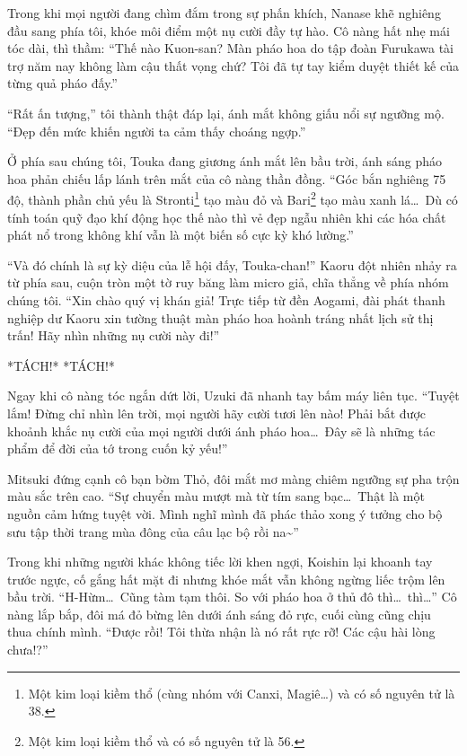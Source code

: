 \documentclass[../main.tex]{subfiles}
\begin{document}
Trong khi mọi người đang chìm đắm trong sự phấn khích, Nanase khẽ nghiêng đầu sang phía tôi, khóe môi điểm một nụ cười đầy tự hào. Cô nàng hất nhẹ mái tóc dài, thì thầm: ``Thế nào Kuon-san? Màn pháo hoa do tập đoàn Furukawa tài trợ năm nay không làm cậu thất vọng chứ? Tôi đã tự tay kiểm duyệt thiết kế của từng quả pháo đấy.''

``Rất ấn tượng,'' tôi thành thật đáp lại, ánh mắt không giấu nổi sự ngưỡng mộ. ``Đẹp đến mức khiến người ta cảm thấy choáng ngợp.''

Ở phía sau chúng tôi, Touka đang giương ánh mắt lên bầu trời, ánh sáng pháo hoa phản chiếu lấp lánh trên mắt của cô nàng thần đồng. ``Góc bắn nghiêng 75 độ, thành phần chủ yếu là Stronti\footnote{Một kim loại kiềm thổ (cùng nhóm với Canxi, Magiê\dots) và có số nguyên tử là 38.} tạo màu đỏ và Bari\footnote{Một kim loại kiềm thổ và có số nguyên tử là 56.} tạo màu xanh lá\dots\ Dù có tính toán quỹ đạo khí động học thế nào thì vẻ đẹp ngẫu nhiên khi các hóa chất phát nổ trong không khí vẫn là một biến số cực kỳ khó lường.''

``Và đó chính là sự kỳ diệu của lễ hội đấy, Touka-chan!'' Kaoru đột nhiên nhảy ra từ phía sau, cuộn tròn một tờ ruy băng làm micro giả, chĩa thẳng về phía nhóm chúng tôi. ``Xin chào quý vị khán giả! Trực tiếp từ đền Aogami, đài phát thanh nghiệp dư Kaoru xin tường thuật màn pháo hoa hoành tráng nhất lịch sử thị trấn! Hãy nhìn những nụ cười này đi!''

*TÁCH!* *TÁCH!*

Ngay khi cô nàng tóc ngắn dứt lời, Uzuki đã nhanh tay bấm máy liên tục. ``Tuyệt lắm! Đừng chỉ nhìn lên trời, mọi người hãy cười tươi lên nào! Phải bắt được khoảnh khắc nụ cười của mọi người dưới ánh pháo hoa\dots\ Đây sẽ là những tác phẩm để đời của tớ trong cuốn kỷ yếu!''

Mitsuki đứng cạnh cô bạn bờm Thỏ, đôi mắt mơ màng chiêm ngưỡng sự pha trộn màu sắc trên cao. ``Sự chuyển màu mượt mà từ tím sang bạc\dots\ Thật là một nguồn cảm hứng tuyệt vời. Mình nghĩ mình đã phác thảo xong ý tưởng cho bộ sưu tập thời trang mùa đông của câu lạc bộ rồi na\~{}''

Trong khi những người khác không tiếc lời khen ngợi, Koishin lại khoanh tay trước ngực, cố gắng hất mặt đi nhưng khóe mắt vẫn không ngừng liếc trộm lên bầu trời. ``H-Hừm\dots\ Cũng tàm tạm thôi. So với pháo hoa ở thủ đô thì\dots\ thì\dots'' Cô nàng lắp bắp, đôi má đỏ bừng lên dưới ánh sáng đỏ rực, cuối cùng cũng chịu thua chính mình. ``Được rồi! Tôi thừa nhận là nó rất rực rỡ! Các cậu hài lòng chưa!?''
\end{document}
